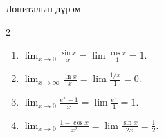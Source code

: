 \begin{frame}[allowframebreaks]{Лопиталын дүрэм}
\begin{example}
\begin{multicols}{2}
\begin{enumerate}[itemsep=2pt]
\item $\displaystyle \lim_{x\to0}\frac{\sin x}{x}=\lim\frac{\cos x}{1}=1.$
\item $\displaystyle \lim_{x\to\infty}\frac{\ln x}{x}=\lim\frac{1/x}{1}=0.$
\item $\displaystyle \lim_{x\to0}\frac{e^x-1}{x}=\lim\frac{e^x}{1}=1.$
\item $\displaystyle \lim_{x\to0}\frac{1-\cos x}{x^2}=\lim\frac{\sin x}{2x}=\frac12.$
\end{enumerate}
\end{multicols}
    
\end{example}
\end{frame}


